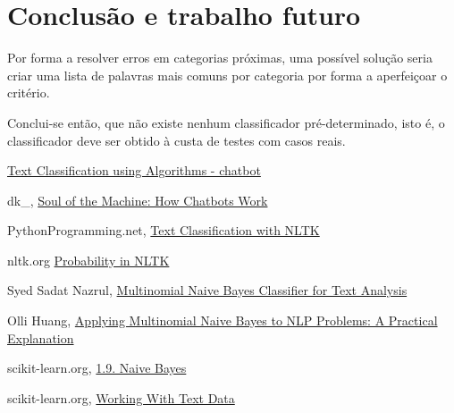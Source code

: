\documentclass[12pt]{article}
\begin{document}
    \section*{Conclusão e trabalho futuro}
    Por forma a resolver erros em categorias próximas, uma possível solução seria criar uma lista de palavras
    mais comuns por categoria por forma a aperfeiçoar o critério.

    Conclui-se então, que não existe nenhum classificador pré-determinado, isto é, o classificador deve ser obtido
    à custa de testes com casos reais.


    \begin{thebibliography}{9}

          \href{https://chatbotslife.com/text-classification-using-algorithms-e4d50dcba45}{Text Classification using Algorithms - chatbot}
        
        dk\_,
        \href{https://medium.com/@gk_/how-chat-bots-work-dfff656a35e2}{Soul of the Machine: How Chatbots Work}

        PythonProgramming.net,
        \href{https://pythonprogramming.net/text-classification-nltk-tutorial/}{Text Classification with NLTK}

        nltk.org
        \href{http://www.nltk.org/howto/probability.html}{Probability in NLTK}

        Syed Sadat Nazrul,
        \href{https://towardsdatascience.com/multinomial-naive-bayes-classifier-for-text-analysis-python-8dd6825ece67}{Multinomial Naive Bayes Classifier for Text Analysis}
        
        Olli Huang,
        \href{https://syncedreview.com/2017/07/17/applying-multinomial-naive-bayes-to-nlp-problems-a-practical-explanation/}{Applying Multinomial Naive Bayes to NLP Problems: A Practical Explanation}

        scikit-learn.org,
        \href{http://scikit-learn.org/stable/modules/naive_bayes.html}{1.9. Naive Bayes}

        scikit-learn.org,
        \href{http://scikit-learn.org/stable/tutorial/text_analytics/working_with_text_data.html}{Working With Text Data}

        \end{thebibliography}
    
\end{document}
